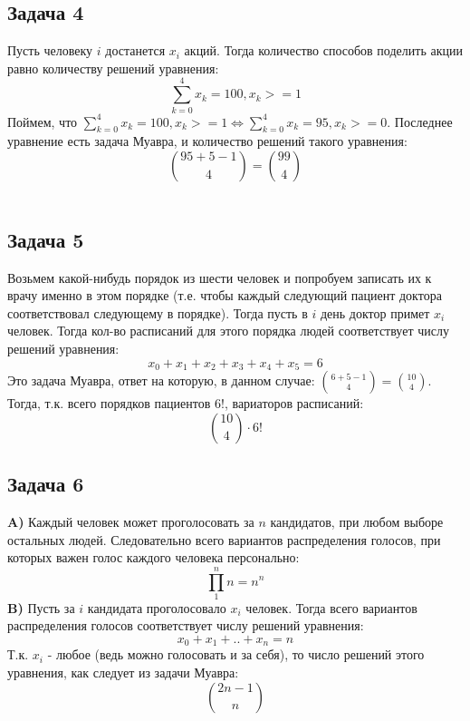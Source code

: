 \documentclass{article}
\begin{document}
\begin{center}
	\subsection*{Задача 4}
\end{center}

Пусть человеку $i$  достанется $x_i$ акций. Тогда количество способов поделить акции равно количеству решений уравнения:
$$ \sum_{k=0}^{4} x_k = 100, x_k >= 1$$
Поймем, что $\sum_{k=0}^{4} x_k = 100, x_k >= 1 \Leftrightarrow \sum_{k=0}^{4} x_k = 95, x_k >= 0$. Последнее уравнение есть задача Муавра, и количество решений такого уравнения:
$$ {95 + 5 - 1 \choose 4} = {99 \choose 4}$$ 
\\
\begin{center}
	\subsection*{Задача 5}
\end{center}
Возьмем какой-нибудь порядок из шести человек и попробуем записать их к врачу именно в этом порядке (т.е. чтобы каждый следующий пациент доктора соответствовал следующему в порядке). Тогда пусть в $i$ день доктор примет $x_i$ человек. Тогда кол-во расписаний для этого порядка людей соответствует числу решений уравнения:
$$ x_0 + x_1 + x_2 + x_3 + x_4 + x_5 = 6 $$
Это задача Муавра, ответ на которую, в данном случае: $ {6 + 5 - 1 \choose 4} = {10 \choose 4}$.
Тогда, т.к. всего порядков пациентов $6!$, вариаторов расписаний:
 $$ {10 \choose 4} \cdot 6!$$
 
 \begin{center}
 	\subsection*{Задача 6}
 \end{center}
 
 \textbf{A)} Каждый человек может проголосовать за $n$ кандидатов, при любом выборе остальных людей. Следовательно всего вариантов распределения голосов, при которых важен голос каждого человека персонально: 
 $$ \prod_{1}^{n} n = n^n $$ 
\textbf{B)} Пусть за $i$ кандидата проголосовало $x_i$ человек. Тогда всего вариантов распределения голосов соответствует числу решений уравнения:
$$ x_0 + x_1 + .. + x_n = n $$
Т.к. $x_i$ - любое (ведь можно голосовать и за себя), то число решений этого уравнения, как следует из задачи Муавра: 
$$ {2n - 1 \choose n} $$
\end{document}
